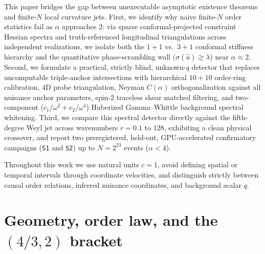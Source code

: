 \documentclass[11pt,a4paper]{article}
\begin{document}
This paper bridges the gap between unexecutable asymptotic existence theorems
and finite-$N$ local curvature jets. First, we identify why naive finite-$N$
order statistics fail as $\alpha$ approaches $2$: via sparse conformal-projected
constraint Hessian spectra and truth-referenced longitudinal triangulations across
independent realizations, we isolate both
the $1+1$ vs.\ $3+1$ conformal stiffness hierarchy and the quantitative
phase-scrambling wall ($\sigma(\hat{u}) \gtrsim \lambda$) near $\alpha \approx 2$.
Second, we formulate a practical, strictly blind, unknown-$q$ detector that
replaces uncomputable triple-anchor intersections with hierarchical $10{+}10$
order-ring calibration, $4\text{D}$ probe triangulation, Neyman $C(\alpha)$
orthogonalization against all nuisance anchor parameters, spin-2 traceless shear
matched filtering, and two-component ($c_1/\omega^2 + c_2/\omega^4$) Huberized
Gamma--Whittle background spectral whitening. Third, we compare this spectral
detector directly against the fifth-degree Weyl jet across wavenumbers $r = 0.1$
to $128$, exhibiting a clean physical crossover, and report two preregistered,
held-out, GPU-accelerated confirmatory campaigns (\texttt{S1} and \texttt{S2}) up to
$N = 2^{23}$ events ($\alpha < 4$).

Throughout this work we use natural units $c=1$, avoid defining spatial or
temporal intervals through coordinate velocities, and distinguish strictly
between causal order relations, inferred nuisance coordinates, and background
scalar $q$.

\section{Geometry, order law, and the \texorpdfstring{$(4/3, 2)$}{(4/3, 2)} bracket}\label{sec:geometry}
\end{document}
